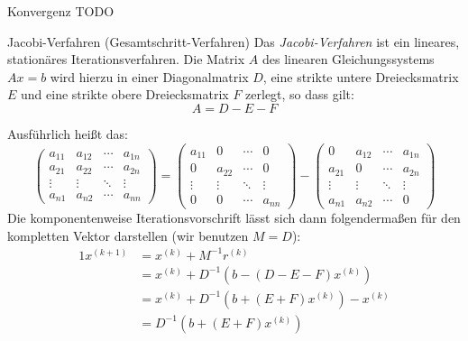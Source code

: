 \begin{example}{Konvergenz}
    TODO
\end{example}

\begin{defi}{Jacobi-Verfahren (Gesamtschritt-Verfahren)}
    Das \emph{Jacobi-Verfahren} ist ein lineares, stationäres Iterationsverfahren.
    Die Matrix $A$ des linearen Gleichungssystems $Ax = b$ wird hierzu in einer Diagonalmatrix $D$, eine strikte untere Dreiecksmatrix $E$ und eine strikte obere Dreiecksmatrix $F$ zerlegt, so dass gilt:
    \[
        A = D - E - F
    \]

    Ausführlich heißt das:
    \[
        \begin{pmatrix}
            a_{11} & a_{12} & \cdots & a_{1n} \\
            a_{21} & a_{22} & \cdots & a_{2n} \\
            \vdots & \vdots & \ddots & \vdots \\
            a_{n1} & a_{n2} & \cdots & a_{nn}
        \end{pmatrix}
        =
        \begin{pmatrix}
            a_{11} & 0      & \cdots & 0      \\
            0      & a_{22} & \cdots & 0      \\
            \vdots & \vdots & \ddots & \vdots \\
            0      & 0      & \cdots & a_{nn}
        \end{pmatrix}
        -
        \begin{pmatrix}
            0      & a_{12} & \cdots & a_{1n} \\
            a_{21} & 0      & \cdots & a_{2n} \\
            \vdots & \vdots & \ddots & \vdots \\
            a_{n1} & a_{n2} & \cdots & 0
        \end{pmatrix}
    \]
    Die komponentenweise Iterationsvorschrift lässt sich dann folgendermaßen für den kompletten Vektor darstellen (wir benutzen $M = D$):
    \begin{alignat*}{1}
        x^{(k+1)} & = x^{(k)} + M^{-1} r^{(k)}                                                   \\
                  & = x^{(k)} + D^{-1} \left( b - (D - E - F) x^{(k)} \right)                    \\
                  & = x^{(k)} + D^{-1} \left( b + \left( E + F \right) x^{(k)} \right) - x^{(k)} \\
                  & = D^{-1} \left( b + (E + F) x^{(k)} \right)
    \end{alignat*}


\end{defi}
